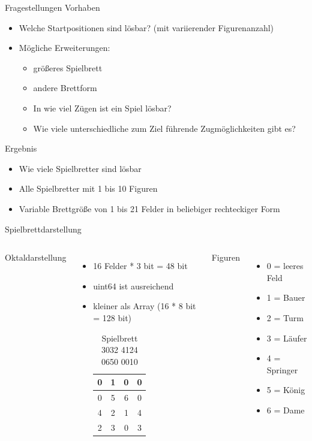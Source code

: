 \documentclass{beamer}
\begin{document}
\begin{frame}{Fragestellungen}
Vorhaben
\begin{itemize}

	\item Welche Startpositionen sind lösbar? (mit variierender Figurenanzahl)
	\item Mögliche Erweiterungen: 
	\begin{itemize}
	\item größeres Spielbrett 
	\item andere Brettform
	\item In wie viel Zügen ist ein Spiel lösbar? 
	\item Wie viele unterschiedliche zum Ziel führende Zugmöglichkeiten gibt es?
	\end{itemize}
\end{itemize}

Ergebnis
\begin{itemize}
	\item Wie viele Spielbretter sind lösbar
	\item Alle Spielbretter mit 1 bis 10 Figuren
	\item Variable Brettgröße von 1 bis 21 Felder in beliebiger rechteckiger Form
\end{itemize}
\end{frame}


\begin{frame}{Spielbrettdarstellung}
\begin{columns}
	Oktaldarstellung
	\begin{itemize}
		\item 16 Felder * 3 bit = 48 bit
		\item uint64 ist ausreichend
		\item kleiner als Array (16 * 8 bit = 128 bit)
		
		\begin{table}
			\begin{tabular}{|c|c|c|c|}\hline
			 0 &  1 &  0 &  0 \\ \hline
			 0 &  5 &  6 &  0 \\ \hline
			 4 &  2 &  1 & 4 \\ \hline
			 2 &  3 &  0 &  3 \\ \hline
			\end{tabular}
			\caption{Spielbrett 3032 4124 0650 0010}
			\label{table:Tabelle1}
		\end{table}
	\end{itemize}
	Figuren
	\begin{itemize}
		\item 0 = leeres Feld
		\item 1 = Bauer
		\item 2 = Turm
		\item 3 = Läufer
		\item 4 = Springer
		\item 5 = König
		\item 6 = Dame
	\end{itemize}		
\end{columns}
\end{frame}
\end{document}
